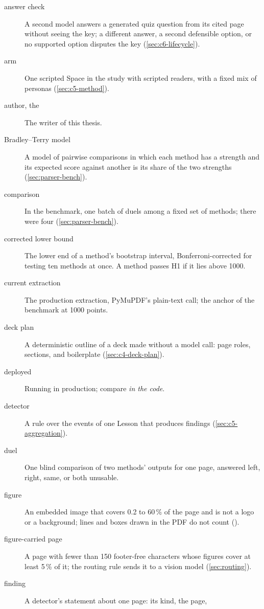 \begin{description}
  \item[answer check] A second model answers a generated quiz question from
    its cited page without seeing the key; a different answer, a second
    defensible option, or no supported option disputes the key
    (\cref{sec:c6-lifecycle}).
  \item[arm] One scripted Space in the study with scripted readers, with a
    fixed mix of personas (\cref{sec:c5-method}).
  \item[author, the] The writer of this thesis.
  \item[Bradley--Terry model] A model of pairwise comparisons in which each
    method has a strength and its expected score against another is its share
    of the two strengths (\cref{sec:parser-bench}).
  \item[comparison] In the benchmark, one batch of duels among a fixed set of
    methods; there were four (\cref{sec:parser-bench}).
  \item[corrected lower bound] The lower end of a method's bootstrap
    interval, Bonferroni-corrected for testing ten methods at once. A method
    passes H1 if it lies above 1000.
  \item[current extraction] The production extraction, PyMuPDF's plain-text
    call; the anchor of the benchmark at 1000 points.
  \item[deck plan] A deterministic outline of a deck made without a model
    call: page roles, sections, and boilerplate (\cref{sec:c4-deck-plan}).
  \item[deployed] Running in production; compare \emph{in the code}.
  \item[detector] A rule over the events of one Lesson that produces
    findings (\cref{sec:c5-aggregation}).
  \item[duel] One blind comparison of two methods' outputs for one page,
    answered left, right, same, or both unusable.
  \item[figure] An embedded image that covers 0.2 to 60\,\% of the page and
    is not a logo or a background; lines and boxes drawn in the PDF do not
    count ().
  \item[figure-carried page] A page with fewer than 150 footer-free
    characters whose figures cover at least 5\,\% of it; the routing rule
    sends it to a vision model (\cref{sec:routing}).
  \item[finding] A detector's statement about one page: its kind, the page,

\end{description}
